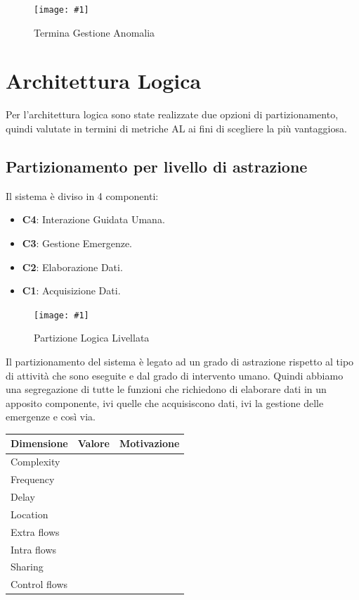 \documentclass[a4paper,11pt,oneside, table]{article}
\newcommand{\putimage}[4] {
	\begin{figure}[H]
	    \centering
	    \texttt{[image: \#1]}
	    \caption{#2}\label{#3}
	\end{figure}
}
\newcommand{\bigimage}[4] {
	\begin{figure}[H]
	    \centering
	    \texttt{[image: \#1]}
	    \caption{#2}\label{#3}
	\end{figure}
}
\begin{document}
\putimage{images/Diagramma delle Attivita'/Termina Gestione Anomalia.png}{Termina Gestione Anomalia}{png:act:termina-gestione-anomalia}{1}

\section{Architettura Logica}

Per l'architettura logica sono state realizzate due opzioni di partizionamento, quindi valutate in termini di metriche AL ai fini di scegliere la pi\`u vantaggiosa.

\subsection{Partizionamento per livello di astrazione}

Il sistema \`e diviso in 4 componenti:
\begin{itemize}
  \item \textbf{C4}: Interazione Guidata Umana.
  \item \textbf{C3}: Gestione Emergenze.
  \item \textbf{C2}: Elaborazione Dati.
  \item \textbf{C1}: Acquisizione Dati.
\end{itemize}

\bigimage{images/Diagramma delle Attivita'/Partizione Logica Livellata.png}{Partizione Logica Livellata}{png:act:partizione-logica-livellata}{1}

Il partizionamento del sistema \`e legato ad un grado di astrazione rispetto al tipo di attivit\`a che sono eseguite e dal grado di intervento umano. Quindi abbiamo una segregazione di tutte le funzioni che richiedono di elaborare dati in un apposito componente, ivi quelle che acquisiscono dati, ivi la gestione delle emergenze e cos\`i via.

\begin{center}
  \begin{tabular}{|l | r | c|}
    \hline
    Dimensione & Valore & Motivazione \\
    \hline
    Complexity & & \\
    Frequency & & \\
    Delay & & \\
    Location & & \\
    Extra flows & & \\
    Intra flows & & \\
    Sharing & & \\
    Control flows & & \\
    \hline
  \end{tabular}
\end{center}
\end{document}
